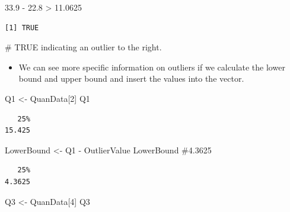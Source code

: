 \documentclass[
  letterpaper,
  DIV=11,
  numbers=noendperiod]{scrreprt}
\newenvironment{Shaded}{\begin{snugshade}}{\end{snugshade}}
\newcommand{\CommentTok}[1]{\textcolor[rgb]{0.37,0.37,0.37}{#1}}
\newcommand{\DecValTok}[1]{\textcolor[rgb]{0.68,0.00,0.00}{#1}}
\newcommand{\FloatTok}[1]{\textcolor[rgb]{0.68,0.00,0.00}{#1}}
\newcommand{\NormalTok}[1]{\textcolor[rgb]{0.00,0.23,0.31}{#1}}
\newcommand{\OtherTok}[1]{\textcolor[rgb]{0.00,0.23,0.31}{#1}}
\newcommand{\SpecialCharTok}[1]{\textcolor[rgb]{0.37,0.37,0.37}{#1}}
\providecommand{\tightlist}{%
  \setlength{\itemsep}{0pt}\setlength{\parskip}{0pt}}\usepackage{longtable,booktabs,array}
\begin{document}
\begin{Shaded}
\begin{Highlighting}[]
\FloatTok{33.9} \SpecialCharTok{{-}} \FloatTok{22.8} \SpecialCharTok{\textgreater{}} \FloatTok{11.0625}
\end{Highlighting}
\end{Shaded}

\begin{verbatim}
[1] TRUE
\end{verbatim}

\begin{Shaded}
\begin{Highlighting}[]
\CommentTok{\# TRUE indicating an outlier to the right.}
\end{Highlighting}
\end{Shaded}

\begin{itemize}
\tightlist
\item
  We can see more specific information on outliers if we calculate the
  lower bound and upper bound and insert the values into the vector.
\end{itemize}

\begin{Shaded}
\begin{Highlighting}[]
\NormalTok{Q1 }\OtherTok{\textless{}{-}}\NormalTok{ QuanData[}\DecValTok{2}\NormalTok{]}
\NormalTok{Q1}
\end{Highlighting}
\end{Shaded}

\begin{verbatim}
   25% 
15.425 
\end{verbatim}

\begin{Shaded}
\begin{Highlighting}[]
\NormalTok{LowerBound }\OtherTok{\textless{}{-}}\NormalTok{ Q1 }\SpecialCharTok{{-}}\NormalTok{ OutlierValue}
\NormalTok{LowerBound  }\CommentTok{\#4.3625 }
\end{Highlighting}
\end{Shaded}

\begin{verbatim}
   25% 
4.3625 
\end{verbatim}

\begin{Shaded}
\begin{Highlighting}[]
\NormalTok{Q3 }\OtherTok{\textless{}{-}}\NormalTok{ QuanData[}\DecValTok{4}\NormalTok{]}
\NormalTok{Q3}
\end{Highlighting}
\end{Shaded}
\end{document}
